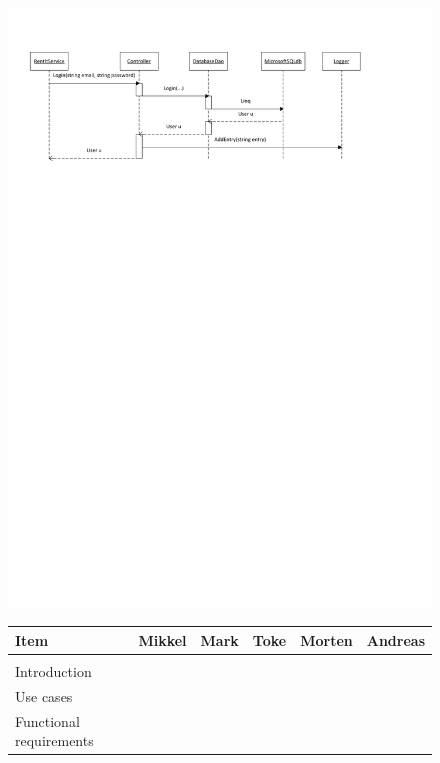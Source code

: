\documentclass[a4paper,11pt,report]{article}
\begin{document}
{\begin{figure}[htp]
\centering
\includegraphics[width=17cm,keepaspectratio=true]{./LoginSD.pdf}
\end{figure}
\begin{figure}[htp]
\begin{tabular}{| l | l | l | l | l | l |}
  \hline
  Item & Mikkel & Mark & Toke & Morten & Andreas \\
  \hline
  \rowcolor{LightGray}\multicolumn{6}{|l|}{Documentation} \\
  \hline
  Introduction &  &\cellcolor{Gray} &\cellcolor{Gray}&  & \\
  \hline
  Use cases \cellcolor{Gray}& \cellcolor{Gray} & \cellcolor{Gray} & \cellcolor{Gray} & \cellcolor{Gray} & \cellcolor{Gray} \\
  \hline
  Functional requirements \cellcolor{Gray}& \cellcolor{Gray} & \cellcolor{Gray} & \cellcolor{Gray} & \cellcolor{Gray} & \cellcolor{Gray} \\

\end{tabular}
\end{figure}}
\end{document}
